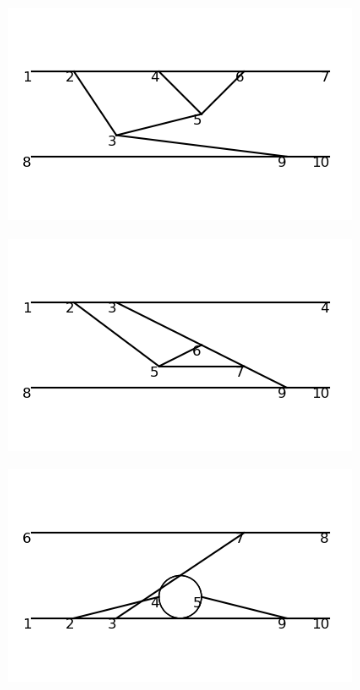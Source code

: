 \documentclass[11pt,a4paper,twoside,pdf]{article}
\numberwithin{equation}{section}
\begin{document}
\begin{figure}[h!]
\begin{subfigure}[t]{0.16\textwidth}
    \end{subfigure}
    \hfill
    \begin{subfigure}[t]{0.16\textwidth}
        \centering
        \includegraphics[width=\textwidth]{plots/order6_2to2/45.png}
    \end{subfigure}
    \hfill
    \begin{subfigure}[t]{0.16\textwidth}
        \centering
        \includegraphics[width=\textwidth]{plots/order6_2to2/46.png}
    \end{subfigure}
    \hfill
    \begin{subfigure}[t]{0.16\textwidth}
        \centering
        \includegraphics[width=\textwidth]{plots/order6_2to2/47.png}

\end{subfigure}
\end{figure}
\end{document}
